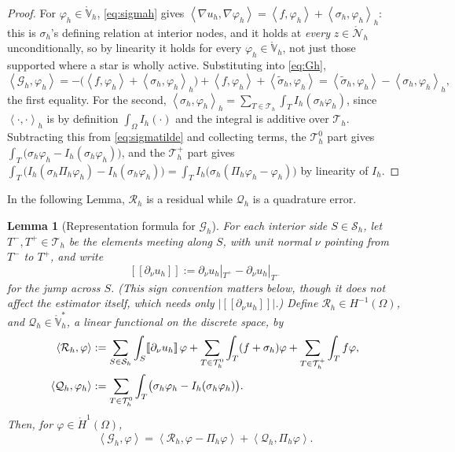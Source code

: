 \documentclass[12pt]{amsart}
\newtheorem{lemma}{Lemma}
\theoremstyle{definition}
\newcommand{\Om}{\Omega}
\newcommand{\Th}{\mathcal{T}_h}
\newcommand{\Vhr}{\mathring{\mathbb{V}}_h}
\newcommand{\Nhr}{\mathring{\mathcal{N}}_h}
\newcommand{\Sh}{\mathcal{S}_h}
\newcommand{\Ih}{I_h}
\newcommand{\Pih}{\Pi_h}
\newcommand{\Thplus}{\Th^+}
\newcommand{\Thzero}{\Th^0}
\newcommand{\Gh}{\mathcal{G}_h}
\newcommand{\Rh}{\mathcal{R}_h}
\newcommand{\Qh}{\mathcal{Q}_h}
\newcommand{\jump}[1]{[\![#1]\!]}
\begin{document}
\begin{proof}
For $\varphi_h\in\Vhr$, \eqref{eq:sigmah} gives $\left<\nabla u_h,\nabla\varphi_h\right> = \left< f,\varphi_h\right> + \left<\sigma_h,\varphi_h\right>_h$: this is $\sigma_h$'s defining relation at interior nodes, and it holds at \emph{every} $z\in\Nhr$ unconditionally, so by linearity it holds for every $\varphi_h \in \Vhr$, not just those supported where a star is wholly active.  Substituting into \eqref{eq:Gh},
\[
  \left<\Gh,\varphi_h\right> = -\bigl(\left< f,\varphi_h\right> + \left<\sigma_h,\varphi_h\right>_h\bigr) + \left< f,\varphi_h\right> + \left<\tilde\sigma_h,\varphi_h\right> = \left<\tilde\sigma_h,\varphi_h\right> - \left<\sigma_h,\varphi_h\right>_h,
\]
the first equality.  For the second, $\left<\sigma_h,\varphi_h\right>_h = \sum_{T\in\Th}\int_T \Ih(\sigma_h\varphi_h)$, since $\left<\cdot,\cdot\right>_h$ is by definition $\int_\Om \Ih(\cdot)$ and the integral is additive over $\Th$.  Subtracting this from \eqref{eq:sigmatilde} and collecting terms, the $\Thzero$ part gives $\int_T \bigl(\sigma_h\varphi_h - \Ih(\sigma_h\varphi_h)\bigr)$, and the $\Thplus$ part gives $\int_T \bigl(\Ih(\sigma_h\Pih\varphi_h) - \Ih(\sigma_h\varphi_h)\bigr) = \int_T \Ih\bigl(\sigma_h(\Pih\varphi_h-\varphi_h)\bigr)$ by linearity of $\Ih$.
\end{proof}

In the following Lemma, $\Rh$ is a residual while $\Qh$ is a quadrature error.

\begin{lemma}[Representation formula for $\Gh$]
\label{lem:Gh-repn}
For each interior side $S \in \Sh$, let $T^-,T^+ \in \Th$ be the elements meeting along $S$, with unit normal $\nu$ pointing from $T^-$ to $T^+$, and write
\begin{equation}
\label{eq:jump}
  \jump{\partial_\nu u_h} := \partial_\nu u_h|_{T^+} - \partial_\nu u_h|_{T^-}
\end{equation}
for the jump across $S$.  (This sign convention matters below, though it does not affect the estimator itself, which needs only $|\jump{\partial_\nu u_h}|$.)  Define $\Rh \in H^{-1}(\Om)$, and $\Qh \in \Vhr^*$, a linear functional on the discrete space, by
\begin{align}
\label{eq:RhQh}
  \left<\Rh,\varphi\right> &:= \sum_{S\in\Sh}\int_S \jump{\partial_\nu u_h}\,\varphi + \sum_{T\in\Thzero}\int_T (f+\sigma_h)\varphi + \sum_{T\in\Thplus}\int_T f\varphi, \\
  \left<\Qh,\varphi_h\right> &:= \sum_{T\in\Thzero}\int_T \bigl(\sigma_h\varphi_h - \Ih(\sigma_h\varphi_h)\bigr). \notag
\end{align}
Then, for $\varphi \in \mathring H^1(\Om)$,
\begin{equation}
\label{eq:Gh-repn}
  \left<\Gh,\varphi\right> = \left<\Rh,\varphi-\Pih\varphi\right> + \left<\Qh,\Pih\varphi\right>.
\end{equation}
\end{lemma}
\end{document}
